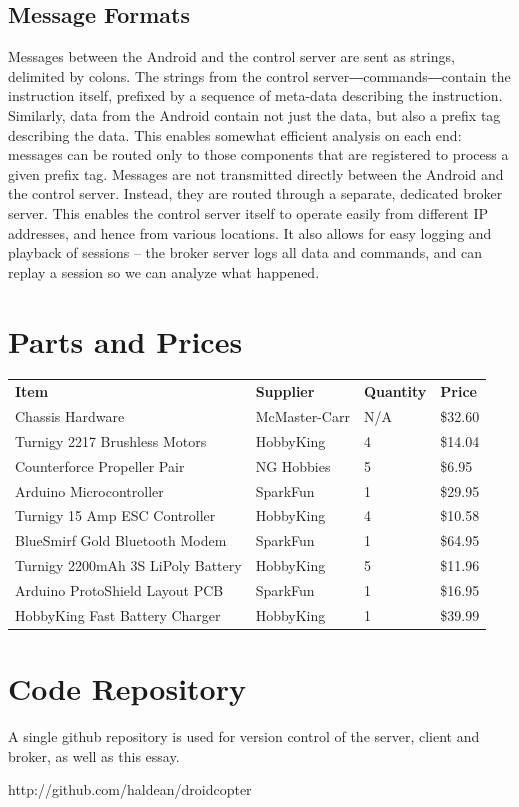 \subsection{Message Formats}
\label{sec:msgs}
‏Messages between the Android and the control server are sent as
strings,‭ ‬delimited by colons.‭ ‬The strings from the control
server―commands―contain the instruction itself,‭ ‬prefixed by a sequence
of meta-data describing the instruction.‭ ‬Similarly,‭ ‬data from the
Android contain not just the data,‭ ‬but also a prefix tag describing
the data.‭ ‬This enables somewhat efficient analysis on each end:‭
‬messages can be routed only to those components that are registered to
process a given prefix tag.  Messages are not transmitted directly
between the Android and the control server.‭ ‬Instead,‭ ‬they are routed
through a separate,‭ ‬dedicated broker server.‭ ‬This enables the control
server itself to operate easily from different IP addresses,‭ ‬and hence
from various locations. It also allows for easy logging and playback
of sessions -- the broker server logs all data and commands, and can
replay a session so we can analyze what happened.

\newpage
\appendix
\section{Parts and Prices}
\label{tab:parts}
\begin{tabular}{llll}
  \textbf{Item} & \textbf{Supplier}
  & \textbf{Quantity} & \textbf{Price} \\

  Chassis Hardware & McMaster-Carr & N/A & \$32.60 \\
  Turnigy 2217 Brushless Motors & HobbyKing & 4 & \$14.04 \\
  Counterforce Propeller Pair & NG Hobbies & 5 & \$6.95 \\
  Arduino Microcontroller & SparkFun & 1 & \$29.95 \\
  Turnigy 15 Amp ESC Controller & HobbyKing & 4 & \$10.58 \\
  BlueSmirf Gold Bluetooth Modem & SparkFun & 1 & \$64.95 \\
  Turnigy 2200mAh 3S LiPoly Battery & HobbyKing & 5 & \$11.96 \\
  Arduino ProtoShield Layout PCB & SparkFun & 1 & \$16.95 \\
  HobbyKing Fast Battery Charger & HobbyKing & 1 & \$39.99 \\
\end{tabular}

\section{Code Repository}
A single github repository is used for version control of the server,
client and broker, as well as this essay.

http://github.com/haldean/droidcopter

